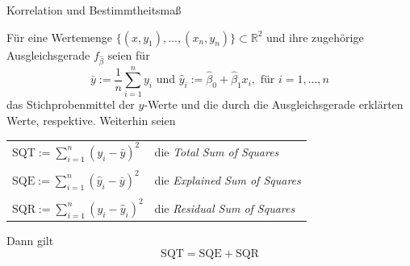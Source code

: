 \documentclass[
  8pt,
  ignorenonframetext,
]{beamer}
\begin{document}
\begin{frame}{Korrelation und Bestimmtheitsmaß}
\protect\hypertarget{korrelation-und-bestimmtheitsmauxdf-3}{}
\small
\begin{theorem}
\justifying
\normalfont
Für eine Wertemenge $\{(x,y_1), ..., (x_n,y_n)\} \subset \mathbb{R}^2$ und ihre
zugehörige Ausgleichsgerade $f_{\hat{\beta}}$ seien für
\begin{equation}
\bar{y} := \frac{1}{n}\sum_{i=1}^n y_i \mbox{ und }
\hat{y}_i := \hat{\beta}_0 + \hat{\beta}_1x_i, \mbox{ für } i= 1,...,n
\end{equation}
das Stichprobenmittel der $y$-Werte und die durch die Ausgleichsgerade erklärten Werte,
respektive. Weiterhin seien

\center
\vspace{1mm}
\begin{tabular}{ll}
$\mbox{SQT} := \sum_{i = 1}^n (y_i - \bar{y})^2$          & die \textit{Total Sum of Squares}      \\\\
$\mbox{SQE} := \sum_{i = 1}^n (\hat{y}_i - \bar{y})^2$    & die \textit{Explained Sum of Squares}  \\\\
$\mbox{SQR} := \sum_{i = 1}^n (y_i - \hat{y}_i)^2$        & die \textit{Residual Sum of Squares}   \\
\end{tabular}
\vspace{1mm}
\flushleft
Dann gilt
\begin{equation}
\mbox{SQT} = \mbox{SQE} + \mbox{SQR}
\end{equation}
\end{theorem}
\end{frame}
\end{document}
